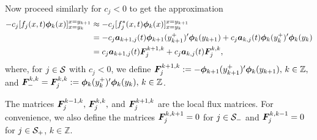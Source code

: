 Now proceed similarly for \(c_j<0\) to get the approximation 
\begin{align*}
	-c_j[f_j(x,t)\boldsymbol\phi_k(x)]_{x=y_k}^{x=y_{k+1}} & \approx -c_j[f_j^*(x,t)\boldsymbol\phi_k(x)]_{x=y_k}^{x=y_{k+1}}
	\\& = -c_j\boldsymbol a_{k+1,j}(t)\boldsymbol \phi_{k+1}(y_{k+1}^+)'{}\boldsymbol\phi_k(y_{k+1}) + c_j\boldsymbol a_{k,j}(t)\boldsymbol \phi_{k}(y_{k}^+)'{}\boldsymbol\phi_k(y_{k})
	\\& = c_j\boldsymbol a_{k+1,j}(t)\boldsymbol F_j^{k+1,k}+c_j\boldsymbol a_{k,j}(t)\boldsymbol F_j^{k,k},
\end{align*}
where, for \(j\in \mathcal{S}\) with \(c_j<0\), we define \(\boldsymbol F_j^{k+1,k} := -\boldsymbol \phi_{k+1}(y_{k+1}^+)'{}\boldsymbol\phi_k(y_{k+1}),\,k\in\mathbb Z,\) and \(\boldsymbol F_-^{k,k}=\boldsymbol F_j^{k,k} := \boldsymbol \phi_{k}(y_{k}^+)'{}\boldsymbol\phi_k(y_{k}),\,k\in\mathbb Z\).

The matrices \(\boldsymbol F_j^{k-1,k},\,\boldsymbol F_j^{k,k},\) and \(\boldsymbol F_j^{k+1,k}\) are the local flux matrices. For convenience, we also define the matrices \(\boldsymbol F_j^{k,k+1}=0\) for \(j\in\mathcal{S}_-\) and \(\boldsymbol F_j^{k,k-1}=0\) for \(j\in\mathcal{S}_+\), \(k\in\mathbb Z\).


